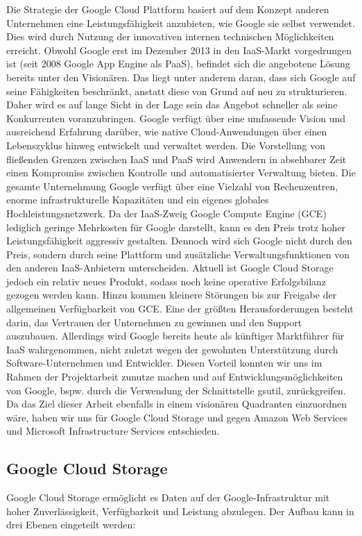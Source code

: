 \documentclass[13pt,a4paper,bibliography=totocnumbered,listof=totocnumbered]{scrartcl}
\begin{document}
Die Strategie der Google Cloud Plattform basiert auf dem Konzept anderen Unternehmen eine Leistungsfähigkeit anzubieten, wie Google sie selbst verwendet. Dies wird durch Nutzung der innovativen internen technischen Möglichkeiten erreicht. Obwohl Google erst im Dezember 2013 in den IaaS-Markt vorgedrungen ist (seit 2008 Google App Engine als PaaS), befindet sich die angebotene Lösung bereits unter den Visionären. Das liegt unter anderem daran, dass sich Google auf seine Fähigkeiten beschränkt, anstatt diese von Grund auf neu zu strukturieren. Daher wird es auf lange Sicht in der Lage sein das Angebot schneller als seine Konkurrenten voranzubringen. Google verfügt über eine umfassende Vision und ausreichend Erfahrung darüber, wie native Cloud-Anwendungen über einen Lebenszyklus hinweg entwickelt und verwaltet werden. Die Vorstellung von fließenden Grenzen zwischen IaaS und PaaS wird Anwendern in absehbarer Zeit einen Kompromiss zwischen Kontrolle und automatisierter Verwaltung bieten. Die gesamte Unternehmung Google verfügt über eine Vielzahl von Rechenzentren, enorme infrastrukturelle Kapazitäten und ein eigenes globales Hochleistungsnetzwerk. Da der IaaS-Zweig Google Compute Engine (GCE) lediglich geringe Mehrkosten für Google darstellt, kann es den Preis trotz hoher Leistungsfähigkeit aggressiv gestalten. Dennoch wird sich Google nicht durch den Preis, sondern durch seine Plattform und zusätzliche Verwaltungsfunktionen von den anderen IaaS-Anbietern unterscheiden. Aktuell ist Google Cloud Storage jedoch ein relativ neues Produkt, sodass noch keine operative Erfolgsbilanz gezogen werden kann. Hinzu kommen kleinere Störungen bis zur Freigabe der allgemeinen Verfügbarkeit von GCE. Eine der größten Herausforderungen besteht darin, das Vertrauen der Unternehmen zu gewinnen und den Support auszubauen. Allerdings wird Google bereits heute als künftiger Marktführer für IaaS wahrgenommen, nicht zuletzt wegen der gewohnten Unterstützung durch Software-Unternehmen und Entwickler. Diesen Vorteil konnten wir uns im Rahmen der Projektarbeit zunutze machen und auf Entwicklungsmöglichkeiten von Google, bspw. durch die Verwendung der Schnittstelle gsutil, zurückgreifen. Da das Ziel dieser Arbeit ebenfalls in einem visionären Quadranten einzuordnen wäre, haben wir uns für Google Cloud Storage und gegen Amazon Web Services und Microsoft Infrastructure Services entschieden.\\
\cite{30}

\subsection{Google Cloud Storage}
Google Cloud Storage ermöglicht es Daten auf der Google-Infrastruktur mit hoher Zuverlässigkeit, Verfügbarkeit und Leistung abzulegen. Der Aufbau kann in drei Ebenen \cite{40} eingeteilt werden:
\end{document}
